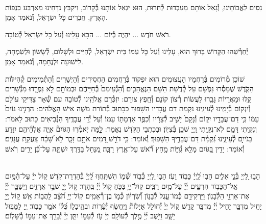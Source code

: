 \documentclass[twoside, openany, parskip=half, 11pt]{book}
\begin{document}
\\
נִסִּים לַאֲבוֹתֵינוּ, וְ֯גָאַל אוֹתָם מֵעַבְדוּת לְ֯חֵרוּת, הוּא יִגְאַל אוֹתָנוּ בְּ֯קָרוֹב, וִיקַבֵּץ נִדָּחֵינוּ מֵאַרְבַּע כַּנְפוֹת הָאָרֶץ, חֲבֵרִים כׇּל יִשְׂרָאֵל, וְ֯נֹאמַר אָמֵן.

רֹאשׁ חֹדֶש ... יִהְיֶה בְּ֯יוֹם ... הַבָּא עָלֵינוּ וְ֯עַל כׇּל יִשְׂרָאֵל לְ֯טוֹבָה.

יְ֯חַדְּ֯שֵׁהוּ הַקָּדוֹשׁ בָּרוּךְ הוּא, עָלֵינוּ וְ֯עַל כׇּל עַמּוֹ בֵּית יִשְׂרָאֵל, לְ֯חַיִּים וּלְשָׁלוֹם, לְ֯שָׂשׂוֹן וּלְשִׂמְחָה, לִישׁוּעָה וּלְנֶחָמָה, וְ֯נֹאמַר אָמֵן.

\sepline

שׁוֹכֵן מְ֯רוֹמִים בְּ֯רַחֲמָיו הָעֲצוּמִים הוּא יִפְקוֹד בְּ֯רַחֲמִים הַחֲסִידִים וְ֯הַיְשָׁרִים וְ֯הַתְּ֯מִימִים קְ֯הִילּוֹת הַקֹּֽדֶשׁ שֶׁמָּסְ֯רוּ נַפְשָׁם עַל קְ֯דֻשַּׁת הַשֵּׁם הַנֶּאֱהָבִ֤ים וְ֯הַנְּ֯עִימִם֙ בְּ֯חַיֵּיהֶ֔ם וּבְמוֹתָ֖ם לֹ֣א נִפְרָ֑דוּ׃ מִנְּ֯שָׁרִים קַֽלּוּ וּמֵאֲרָיוֹת גָּבֵֽרוּ לַעֲשׂוֹת רְ֯צוֹן קוֹנָם וְ֯חֵֽפֶץ צוּרָם: יִזְכְּ֯רֵם אֱלֹהֵֽינוּ לְ֯טוֹבָה עִם שְׁ֯אָר צַדִּיקֵי עוֹלָם וְ֯יִנְקוֹם בְּ֯יָמֵֽינוּ לְ֯עֵינֵֽינוּ נִקְמַת דַּם עֲבָדָיו הַשָּׁפוּךְ כַּכָּתוּב בְּ֯תוֹרַת מֹשֶׁה אִישׁ הָאֱלֹהִים: הַרְנִ֤ינוּ גוֹיִם֙ עַמּ֔וֹ כִּ֥י דַם־עֲבָדָ֖יו יִקּ֑וֹם וְ֯נָקָם֙ יָשִׁ֣יב לְ֯צָרָ֔יו וְ֯כִפֶּ֥ר אַדְמָת֖וֹ עַמּֽוֹ׃ וְ֯עַל יְ֯דֵי עֲבָדֶֽיךָ הַנְּ֯בִיאִים כָּתוּב לֵאמֹר: וְנִקֵּ֖יתִי דָּמָ֣ם לֹֽא־נִקֵּ֑יתִי וַֽיְיָ֖ שֹׁכֵ֥ן בְּ֯צִיּֽוֹן׃ וּבְכִתְבֵי הַקֹּֽדֶשׁ נֶאֱמַר: לׇׇׇׇ֤מָּה יֹֽאמְ֯ר֣וּ הַגּוֹיִם֘ אַיֵּ֢ה אֱלֹֽהֵ֫יהֶ֥ם יִוָּדַ֣ע בַּגֹּייִ֣ם לְ֯עֵינֵ֑ינוּ נִ֝קְמַ֗ת דַּם־עֲבָדֶ֥יךָ הַשָּׁפֽוּךְ׃ וְ֯אוֹמֵר: כִּ֤י דֹרֵ֣שׁ דָּ֭מִים אֹתָ֣ם זָכָ֑ר לֹ֥א שָׁ֝כַ֗ח צַֽעֲקַ֥ת עֲנָוִֽים׃ וְ֯אוֹמֵר: יָדִ֣ין בַּ֭גּוֹיִם מָלֵ֣א גְ֯וִיּ֑וֹת מָ֥חַץ רֹ֝֗אשׁ עַל־אֶ֥רֶץ רַבָּֽה׃ מִ֭נַּחַל בַּדֶּ֣רֶךְ יִשְׁתֶּ֑ה עַל־כֵּ֝֗ן יָרִ֥ים רֹֽאשׁ׃



\vspace{-0.5\baselineskip}
\ashrei


\yehalelu

\\
%
הָב֣וּ לַ֭יְיָ בְּ֯נֵ֣י אֵלִ֑ים הָב֥וּ לַֽ֝יְיָ֗ כָּב֥וֹד וָעֹֽז׃
הָב֣וּ לַ֭יְיָ כְּ֯ב֣וֹד שְׁ֯מ֑וֹ הִשְׁתַּֽחֲו֥וּ לַֽ֝יְיָ֗ בְּ֯הַדְרַת־קֹֽדֶשׁ׃
ק֥וֹל יְיָ֗ עַל־הַ֫מָּ֥יִם אֵֽל־הַכָּב֥וֹד הִרְעִ֑ים יְ֜יָ֗ עַל־מַ֥יִם רַבִּֽים׃
קֽוֹל־יְיָ֥ בַּכֹּ֑חַ ק֥וֹל יְ֜יָ֗ בֶּֽהָדָר׃
ק֣וֹל יְ֖יָ֥ שֹׁבֵ֣ר אֲרָזִ֑ים וַיְשַׁבֵּ֥ר יְ֜יָ֗ אֶת־אַרְזֵ֥י הַלְּ֯בָנֽוֹן׃
וַיַּרְקִידֵ֥ם כְּ֯מוֹ־עֵ֑גֶל לְ֯בָנ֥וֹן וְ֝֯שִׂרְי֗וֹן כְּ֯מ֣וֹ בֶן־רְ֯אֵמִֽים׃
קֽוֹל־יְיָ֥ חֹ֝צֵ֗ב לַֽהֲב֥וֹת אֵֽשׁ׃
ק֣וֹל יְ֖יָ֥ יָחִ֣יל מִדְבָּ֑ר יָחִ֥יל יְ֜יָ֗ מִדְבַּ֣ר קָדֵֽשׁ׃
ק֣וֹל יְיָ֙ יְ֯חוֹלֵ֣ל אַיָּלוֹת֘ וַיֶּֽחֱשׂ֢ף יְ֯עָ֫ר֥וֹת וּבְהֵֽיכָל֑וֹ כֻּ֝לּ֗וֹ אֹמֵ֥ר כָּבֽוֹד׃
יְ֖יָ לַמַּבּ֣וּל יָשָׁ֑ב וַיֵּ֥שֶׁב יְ֜יָ֗ מֶ֣לֶךְ לְ֯עוֹלָֽם׃
יְיָ֗ עֹ֖ז לְ֯עַמּ֣וֹ יִתֵּ֑ן יְיָ֓ יְ֯בָרֵ֖ךְ אֶת־עַמּ֣וֹ בַ֯שָּׁלֽוֹם׃
\end{document}
